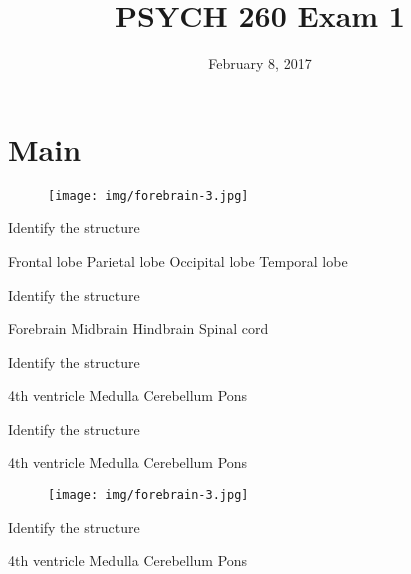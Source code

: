 \documentclass[answers]{exam}
\title{PSYCH 260 Exam 1}
\author{}
\date{February 8, 2017}
\begin{document}
\maketitle

\begin{center}
\end{center}
\vspace{0.1in}

\newpage

\section{Main}

\begin{questions}

\begin{figure}[h]
\texttt{[image: img/forebrain-3.jpg]}
\centering
\end{figure}

\question Identify the structure
\begin{choices}
\correctchoice Frontal lobe
\choice Parietal lobe
\choice Occipital lobe
\choice Temporal lobe
\end{choices}

\question Identify the structure
\begin{choices}
\choice Forebrain
\correctchoice Midbrain
\choice Hindbrain
\choice Spinal cord
\end{choices}

\question Identify the structure
\begin{choices}
\choice 4th ventricle
\choice Medulla
\choice Cerebellum
\correctchoice Pons
\end{choices}

\question Identify the structure
\begin{choices}
\choice 4th ventricle
\correctchoice Medulla
\choice Cerebellum
\choice Pons
\end{choices}

\newpage

\begin{figure}[h]
\texttt{[image: img/forebrain-3.jpg]}
\centering
\end{figure}

\question Identify the structure
\begin{choices}
\choice 4th ventricle
\choice Medulla
\correctchoice Cerebellum
\choice Pons
\end{choices}


\end{questions}
\end{document}
